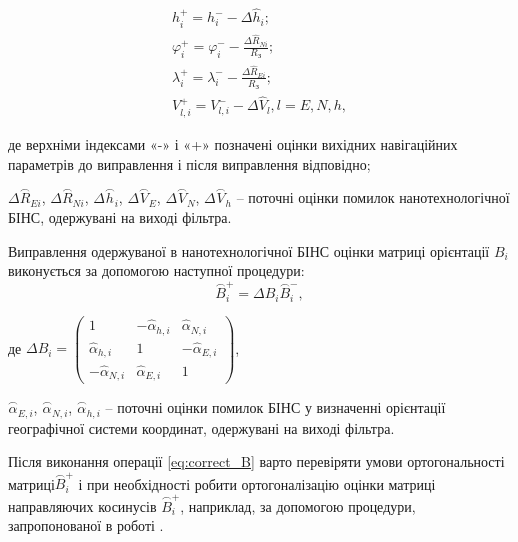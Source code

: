 \begin{equation} \label{eq:correct_lam_phi_V} 
\begin{array}{l} 
{h^{+}_{i} =h^{-}_{i} -\Delta \hat{h}_{i} ;} \\ 
{\varphi_{i}^{+} =\varphi ^{-}_{i} -\frac{\Delta \hat{R}_{Ni} }{R_{\text{З}} } ;} \\ 
{\lambda_{i}^{+} =\lambda ^{-}_{i} -\frac{\Delta \hat{R}_{Ei} }{R_{\text{З}} } ;} \\ 
{V^{+}_{l,i}=V^{-}_{l,i} -\Delta \hat{V}_{l} , l=E,N,h,} \end{array} 
\end{equation} 
\begin{ESKDexplanation}
\item де верхніми індексами  «-» і «+» позначені оцінки вихідних навігаційних параметрів 
до виправлення і після виправлення відповідно;
\item $\Delta \stackrel{\frown}{R}_{Ei} $, $\Delta \stackrel{\frown}{R}_{Ni} $, $\Delta 
\stackrel{\frown}{h}_{i} $, $\Delta \stackrel{\frown}{V}_{E} $, $\Delta \stackrel{
\frown}{V}_{N} $, $\Delta \stackrel{\frown}{V}_{h} $ -- поточні оцінки помилок нанотехнологічної 
БІНС, одержувані на виході фільтра.
\end{ESKDexplanation}
Виправлення одержуваної в нанотехнологічної БІНС оцінки матриці орієнтації $B_{i} $ виконується 
за допомогою наступної процедури:
\begin{equation}
\label{eq:correct_B}
\stackrel{\frown}{B}^{+}_{i} =\Delta B_{i} \stackrel{\frown}{B}^{-}_{i},
\end{equation}
\begin{ESKDexplanation}
\item де
$\Delta B_{i} =\left(\begin{array}{ccc} 
{1} & {-\hat{\alpha }_{h,i} } & {\hat{\alpha }_{N,i} }\\ 
{\hat{\alpha }_{h,i} } & {1} & {-\hat{\alpha }_{E,i} }\\ 
{-\hat{\alpha }_{N,i} } & {\hat{\alpha }_{E,i} } & {1} \end{array}\right)$,                                              
\item $\stackrel{\frown}{\alpha }_{E,i} $, $\stackrel{\frown}{\alpha }_{N,i} $, 
$\stackrel{\frown}{\alpha }_{h,i} $ -- поточні оцінки помилок  БІНС   у визначенні 
орієнтації географічної системи координат, одержувані на виході фільтра.
\end{ESKDexplanation}

Після виконання операції \eqref{eq:correct_B} варто перевіряти умови ортогональності 
матриці$\stackrel{\frown}{B}^{+}_{i} $ і при необхідності робити ортогоналізацію 
оцінки матриці направляючих косинусів $\stackrel{\frown}{B}^{+}_{i} $, наприклад, 
за допомогою процедури, запропонованої в роботі \cite{bib:7}.

